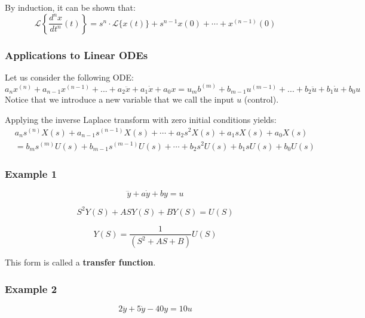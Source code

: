 By induction, it can be shown that:
\begin{equation}
    {\mathcal {L}}\left\{\frac{d^{n}x}{dt^{n}}(t)\right\}=s^{n}\cdot {\mathcal {L}}\{x(t)\}+s^{n-1}x(0)+\cdots +x^{(n-1)}(0)
\end{equation}

\subsubsection{Applications to Linear ODEs}

Let us consider the following ODE:
\begin{equation}
    a_{n}x^{(n)} +a_{n-1}x^{(n-1)}+...+a_{2}\ddot x+a_{1}\dot x + a_0 x= u_{m}b^{(m)} +b_{m-1}u^{(m-1)}+...+b_{2}\ddot u+b_{1}\dot u + b_0 u
\end{equation}
Notice that we introduce a new variable that we call the input \(u\) (control).

Applying the inverse Laplace transform with zero initial conditions yields:
\begin{equation}
    \begin{aligned}
        &a_{n}s^{(n)}X(s) +a_{n-1}s^{(n-1)}X(s)+\cdots+a_{2} s^2 X(s)+a_{1}s X(s) + a_0 X(s) \\
        &= b_{m}s^{(m)}U(s) +b_{m-1}s^{(m-1)}U(s)+\cdots+b_{2}s^2 U(s)+b_{1}sU(s) + b_0 U(s)
    \end{aligned}
\end{equation}


\subsubsection*{Example 1}
\begin{equation}
    \dddot y + a\dot y + by = u
\end{equation}

\begin{equation}
    S^2 Y(S) + ASY(S) + BY(S) = U(S)
\end{equation}

\begin{equation}
    Y(S) = \frac{1}{(S^2 + AS + B)} U(S)
\end{equation}

This form is called a \textbf{transfer function}. 

\subsubsection*{Example 2}
\begin{equation}
    2 \dddot y + 5 \dot y - 40 y = 10 u
\end{equation}

